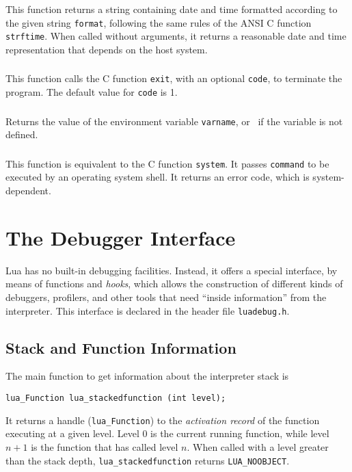 This function returns a string containing date and time
formatted according to the given string \verb'format',
following the same rules of the ANSI C function \verb'strftime'.
When called without arguments,
it returns a reasonable date and time representation that depends on
the host system.

\subsubsection*{}

This function calls the C function \verb-exit-,
with an optional \verb-code-,
to terminate the program.
The default value for \verb-code- is 1.

\subsubsection*{}

Returns the value of the environment variable \verb|varname|,
or \nil\ if the variable is not defined.

\subsubsection*{}

This function is equivalent to the C function \verb|system|.
It passes \verb|command| to be executed by an operating system shell.
It returns an error code, which is system-dependent.


\section{The Debugger Interface} \label{debugI}

Lua has no built-in debugging facilities.
Instead, it offers a special interface,
by means of functions and {\em hooks},
which allows the construction of different
kinds of debuggers, profilers, and other tools
that need ``inside information'' from the interpreter.
This interface is declared in the header file \verb'luadebug.h'.

\subsection{Stack and Function Information}

The main function to get information about the interpreter stack
is
\begin{verbatim}
lua_Function lua_stackedfunction (int level);
\end{verbatim}
It returns a handle (\verb'lua_Function') to the {\em activation record\/}
of the function executing at a given level.
Level 0 is the current running function,
while level $n+1$ is the function that has called level $n$.
When called with a level greater than the stack depth,
\verb'lua_stackedfunction' returns \verb'LUA_NOOBJECT'.

